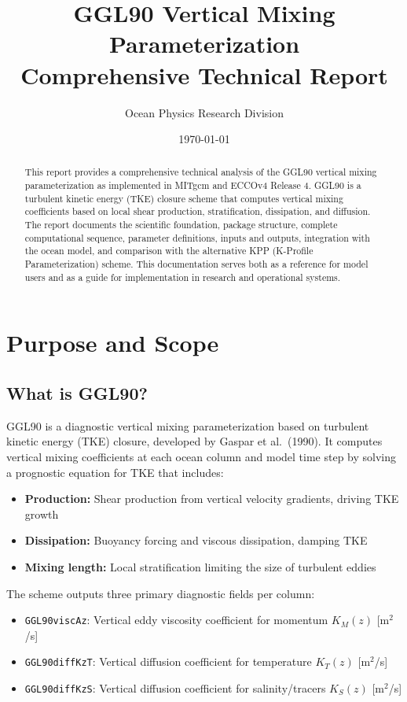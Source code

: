 \documentclass[11pt, a4paper]{article}
\title{\textbf{GGL90 Vertical Mixing Parameterization} \\ \large Comprehensive Technical Report}
\author{Ocean Physics Research Division}
\date{\today}
\begin{document}
\maketitle

\begin{abstract}
This report provides a comprehensive technical analysis of the GGL90 vertical mixing parameterization as implemented in MITgcm and ECCOv4 Release 4. GGL90 is a turbulent kinetic energy (TKE) closure scheme that computes vertical mixing coefficients based on local shear production, stratification, dissipation, and diffusion. The report documents the scientific foundation, package structure, complete computational sequence, parameter definitions, inputs and outputs, integration with the ocean model, and comparison with the alternative KPP (K-Profile Parameterization) scheme. This documentation serves both as a reference for model users and as a guide for implementation in research and operational systems.
\end{abstract}

\tableofcontents
\newpage

\section{Purpose and Scope}

\subsection{What is GGL90?}

GGL90 is a diagnostic vertical mixing parameterization based on turbulent kinetic energy (TKE) closure, developed by Gaspar et al.\ (1990). It computes vertical mixing coefficients at each ocean column and model time step by solving a prognostic equation for TKE that includes:

\begin{itemize}
    \item \textbf{Production:} Shear production from vertical velocity gradients, driving TKE growth
    \item \textbf{Dissipation:} Buoyancy forcing and viscous dissipation, damping TKE
    \item \textbf{Mixing length:} Local stratification limiting the size of turbulent eddies
\end{itemize}

The scheme outputs three primary diagnostic fields per column:

\begin{itemize}
    \item \texttt{GGL90viscAz}: Vertical eddy viscosity coefficient for momentum $K_M(z)$ [m$^2$/s]
    \item \texttt{GGL90diffKzT}: Vertical diffusion coefficient for temperature $K_T(z)$ [m$^2$/s]
    \item \texttt{GGL90diffKzS}: Vertical diffusion coefficient for salinity/tracers $K_S(z)$ [m$^2$/s]
\end{itemize}
\end{document}
